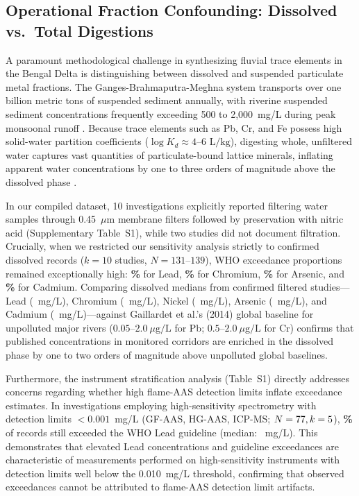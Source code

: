 \documentclass[authoryear,preprint,12pt]{elsarticle}
\begin{document}
\subsection{Operational Fraction Confounding: Dissolved vs.\ Total Digestions}
A paramount methodological challenge in synthesizing fluvial trace elements in the Bengal Delta is distinguishing between dissolved and suspended particulate metal fractions. The Ganges-Brahmaputra-Meghna system transports over one billion metric tons of suspended sediment annually, with riverine suspended sediment concentrations frequently exceeding 500 to 2,000~mg/L during peak monsoonal runoff \citep{Goodbred1999}. Because trace elements such as Pb, Cr, and Fe possess high solid-water partition coefficients ($\log K_d \approx 4\text{--}6\text{ L/kg}$), digesting whole, unfiltered water captures vast quantities of particulate-bound lattice minerals, inflating apparent water concentrations by one to three orders of magnitude above the dissolved phase \citep{Gaillardet2014}.

In our compiled dataset, 10 investigations explicitly reported filtering water samples through 0.45~$\mu\text{m}$ membrane filters followed by preservation with nitric acid (Supplementary Table~S1), while two studies did not document filtration. Crucially, when we restricted our sensitivity analysis strictly to confirmed dissolved records ($k=10$ studies, $N=131$--$139$), WHO exceedance proportions remained exceptionally high: \textbf{\LeadConfirmedDissolvedWhoPct\%} for Lead, \textbf{\ChromiumConfirmedDissolvedWhoPct\%} for Chromium, \textbf{\ArsenicConfirmedDissolvedWhoPct\%} for Arsenic, and \textbf{\CadmiumConfirmedDissolvedWhoPct\%} for Cadmium. Comparing dissolved medians from confirmed filtered studies—Lead (\LeadConfirmedDissolvedMedian~mg/L), Chromium (\ChromiumConfirmedDissolvedMedian~mg/L), Nickel (\NickelConfirmedDissolvedMedian~mg/L), Arsenic (\ArsenicConfirmedDissolvedMedian~mg/L), and Cadmium (\CadmiumConfirmedDissolvedMedian~mg/L)—against Gaillardet et al.'s (2014) global baseline for unpolluted major rivers ($0.05\text{--}2.0~\mu\text{g/L}$ for Pb; $0.5\text{--}2.0~\mu\text{g/L}$ for Cr) confirms that published concentrations in monitored corridors are enriched in the dissolved phase by one to two orders of magnitude above unpolluted global baselines.

Furthermore, the instrument stratification analysis (Table~S1) directly addresses concerns regarding whether high flame-AAS detection limits inflate exceedance estimates. In investigations employing high-sensitivity spectrometry with detection limits $<0.001$~mg/L (GF-AAS, HG-AAS, ICP-MS; $N=77, k=5$), \textbf{\LeadHighSensExceedPct\%} of records still exceeded the WHO Lead guideline (median: \LeadHighSensMedian~mg/L). This demonstrates that elevated Lead concentrations and guideline exceedances are characteristic of measurements performed on high-sensitivity instruments with detection limits well below the 0.010~mg/L threshold, confirming that observed exceedances cannot be attributed to flame-AAS detection limit artifacts.
\end{document}
